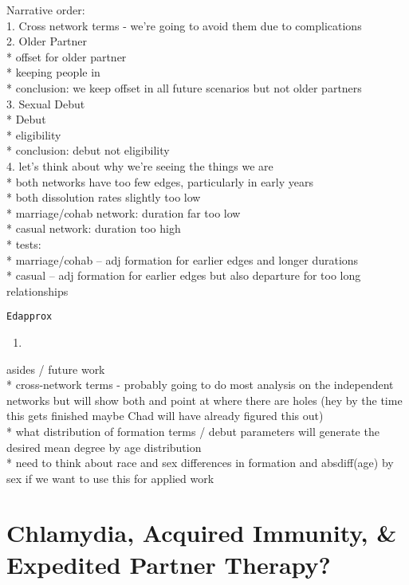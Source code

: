 \documentclass [11pt, proquest] {uwthesis}[2015/03/03]
\begin{document}
Narrative order:\\
1. Cross network terms - we're going to avoid them due to
complications\\
2. Older Partner\\
* offset for older partner\\
* keeping people in\\
* conclusion: we keep offset in all future scenarios but not older
partners\\
3. Sexual Debut\\
* Debut\\
* eligibility\\
* conclusion: debut not eligibility\\
4. let's think about why we're seeing the things we are\\
* both networks have too few edges, particularly in early years\\
* both dissolution rates slightly too low\\
* marriage/cohab network: duration far too low\\
* casual network: duration too high\\
* tests:\\
* marriage/cohab -- adj formation for earlier edges and longer
durations\\
* casual -- adj formation for earlier edges but also departure for too
long relationships
\begin{verbatim}
Edapprox  
\end{verbatim}
\begin{enumerate}
\def\labelenumi{\arabic{enumi}.}
\setcounter{enumi}{4}
\item
\end{enumerate}
asides / future work\\
* cross-network terms - probably going to do most analysis on the
independent networks but will show both and point at where there are
holes (hey by the time this gets finished maybe Chad will have already
figured this out)\\
* what distribution of formation terms / debut parameters will generate
the desired mean degree by age distribution\\
* need to think about race and sex differences in formation and
absdiff(age) by sex if we want to use this for applied work

\chapter{Chlamydia, Acquired Immunity, \& Expedited Partner
Therapy?}\label{ept}
\end{document}
